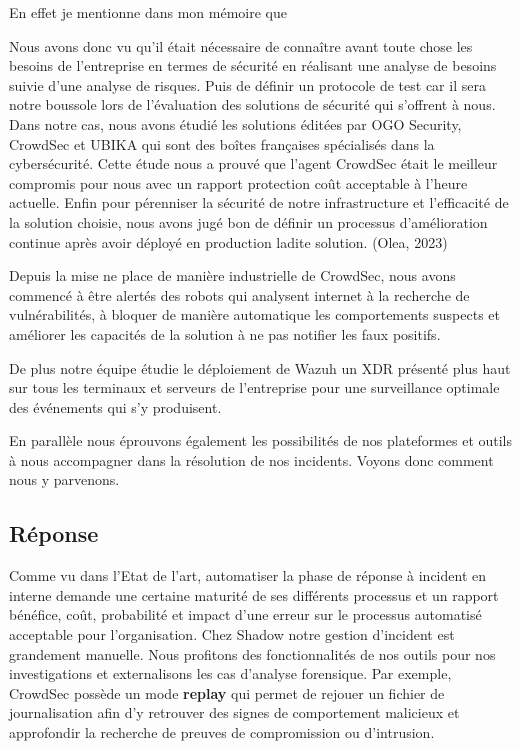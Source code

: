 \documentclass[
  11pt,
  a4paper,
  krantz2,
  11pt,
  oneside]{krantz}
\renewenvironment{quote}{\begin{VF}}{\end{VF}}
\begin{document}
En effet je mentionne dans mon mémoire que

\begin{quote}
Nous avons donc vu qu'il était nécessaire de connaître avant toute chose les besoins de l'entreprise en termes de sécurité en réalisant une analyse de besoins suivie d'une analyse de risques. Puis de définir un protocole de test car il sera notre boussole lors de l'évaluation des solutions de sécurité qui s'offrent à nous. Dans notre cas, nous avons étudié les solutions éditées par OGO Security, CrowdSec et UBIKA qui sont des boîtes françaises spécialisés dans la cybersécurité. Cette étude nous a prouvé que l'agent CrowdSec était le meilleur compromis pour nous avec un rapport protection coût acceptable à l'heure actuelle. Enfin pour pérenniser la sécurité de notre infrastructure et l'efficacité de la solution choisie, nous avons jugé bon de définir un processus d'amélioration continue après avoir déployé en production ladite solution. (Olea, 2023)
\end{quote}

Depuis la mise ne place de manière industrielle de CrowdSec, nous avons commencé à être alertés des robots qui analysent internet à la recherche de vulnérabilités, à bloquer de manière automatique les comportements suspects et améliorer les capacités de la solution à ne pas notifier les faux positifs.

De plus notre équipe étudie le déploiement de Wazuh un XDR présenté plus haut sur tous les terminaux et serveurs de l'entreprise pour une surveillance optimale des événements qui s'y produisent.

En parallèle nous éprouvons également les possibilités de nos plateformes et outils à nous accompagner dans la résolution de nos incidents. Voyons donc comment nous y parvenons.

\subsection{Réponse}\label{ruxe9ponse}

Comme vu dans l'Etat de l'art, automatiser la phase de réponse à incident en interne demande une certaine maturité de ses différents processus et un rapport bénéfice, coût, probabilité et impact d'une erreur sur le processus automatisé acceptable pour l'organisation. Chez Shadow notre gestion d'incident est grandement manuelle. Nous profitons des fonctionnalités de nos outils pour nos investigations et externalisons les cas d'analyse forensique. Par exemple, CrowdSec possède un mode \textbf{replay} qui permet de rejouer un fichier de journalisation afin d'y retrouver des signes de comportement malicieux et approfondir la recherche de preuves de compromission ou d'intrusion.
\end{document}
